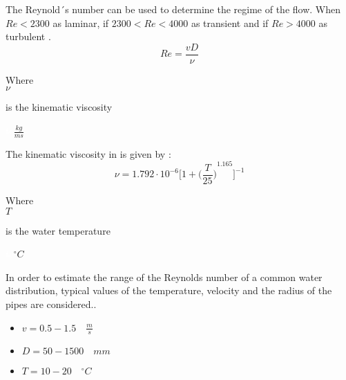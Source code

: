  
The Reynold´s number can be used to determine the regime of the flow. When $Re<2300$ as laminar, if $2300<Re<4000$ as transient and if
$Re>4000$ as turbulent \cite{Intro_Fluid}. 
\begin{equation}
   Re = \frac{vD}{\nu}
   \label{Reynolds}
 \end{equation}
 
  \begin{minipage}[t]{0.20\textwidth}
Where\\
\hspace*{8mm} $\nu$ 
\end{minipage}
\begin{minipage}[t]{0.68\textwidth}
\vspace*{2mm}
is the kinematic viscosity

\end{minipage}
\begin{minipage}[t]{0.10\textwidth}
\vspace*{2mm}
\textcolor{White}{te}$\unit{\frac{kg}{ms}}$
\end{minipage}

The kinematic viscosity in \cite{Design_Water} is given by :
\begin{equation}
  \nu = 1.792 \cdot 10^{-6} \bigg[1+{\bigg(\frac{T}{25}\bigg)}^{1.165} \bigg]^{-1}
\end{equation}

  \begin{minipage}[t]{0.20\textwidth}
Where\\
\hspace*{8mm} $T$ 
\end{minipage}
\begin{minipage}[t]{0.68\textwidth}
\vspace*{2mm}
is the water temperature  
 \end{minipage}
\begin{minipage}[t]{0.10\textwidth}
\vspace*{2mm}
\textcolor{White}{te}$\unit{^{\circ} C}$
\end{minipage}

In order to estimate the range of the Reynolds number of a common water 
distribution, typical values of the temperature, velocity and the radius of 
the pipes are considered.\cite{Urban_Design}. 

\begin{itemize}
  \item $v = 0.5 - 1.5  \quad \frac{m}{s}$
  \item $D = 50 - 1500\quad mm$
  \item $T = 10 - 20 \quad ^{\circ} C$
\end{itemize}

